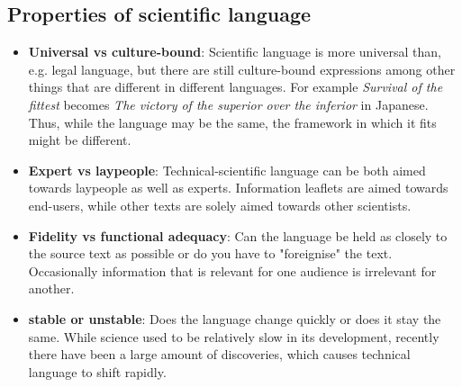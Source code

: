 \documentclass{article}
\begin{document}
	\subsection{Properties of scientific language}
	\begin{itemize}
		\item{\textbf{Universal vs culture-bound}: Scientific language is more universal than, e.g. legal language, but there are still culture-bound expressions among other things that are different in different languages. For example \textit{Survival of the fittest} becomes \textit{The victory of the superior over the inferior} in Japanese. Thus, while the language may be the same, the framework in which it fits might be different.}
		\item{\textbf{Expert vs laypeople}: Technical-scientific language can be both aimed towards laypeople as well as experts. Information leaflets are aimed towards end-users, while other texts are solely aimed towards other scientists.}
		\item{\textbf{Fidelity vs functional adequacy}: Can the language be held as closely to the source text as possible or do you have to "foreignise" the text. Occasionally information that is relevant for one audience is irrelevant for another.}
		\item{\textbf{stable or unstable}: Does the language change quickly or does it stay the same. While science used to be relatively slow in its development, recently there have been a large amount of discoveries, which causes technical language to shift rapidly.}
	\end{itemize}

	

	

















	
\end{document}
